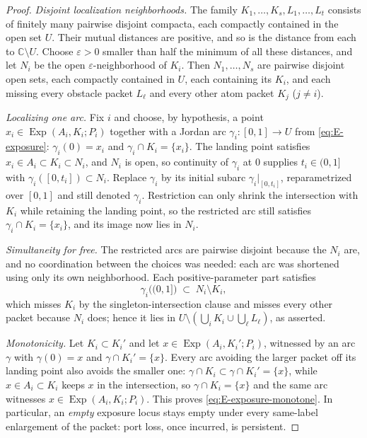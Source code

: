 \documentclass[11pt,reqno]{amsart}
\theoremstyle{definition}
\theoremstyle{remark}
\newcommand{\C}{\mathbb C}
\newcommand{\Exp}{\operatorname{Exp}}
\begin{document}
\begin{proof}
\emph{Disjoint localization neighborhoods.}
The family $K_1,\dots,K_s,L_1,\dots,L_t$ consists of finitely many pairwise disjoint
compacta, each compactly contained in the open set $U$. Their mutual distances are
positive, and so is the distance from each to $\C\setminus U$. Choose
$\varepsilon>0$ smaller than half the minimum of all these distances, and let $N_i$
be the open $\varepsilon$-neighborhood of $K_i$. Then $N_1,\dots,N_s$ are pairwise
disjoint open sets, each compactly contained in $U$, each containing its $K_i$, and
each missing every obstacle packet $L_\ell$ and every other atom packet $K_j$
($j\neq i$).

\emph{Localizing one arc.}
Fix $i$ and choose, by hypothesis, a point $x_i\in\Exp(A_i,K_i;P_i)$ together with a
Jordan arc $\gamma_i\colon[0,1]\to U$ from \eqref{eq:E-exposure}:
$\gamma_i(0)=x_i$ and $\gamma_i\cap K_i=\{x_i\}$. The landing point satisfies
$x_i\in A_i\subset K_i\subset N_i$, and $N_i$ is open, so continuity of $\gamma_i$ at
$0$ supplies $t_i\in(0,1]$ with $\gamma_i([0,t_i])\subset N_i$. Replace $\gamma_i$ by
its initial subarc $\gamma_i|_{[0,t_i]}$, reparametrized over $[0,1]$ and still
denoted $\gamma_i$. Restriction can only shrink the intersection with $K_i$ while
retaining the landing point, so the restricted arc still satisfies
$\gamma_i\cap K_i=\{x_i\}$, and its image now lies in $N_i$.

\emph{Simultaneity for free.}
The restricted arcs are pairwise disjoint because the $N_i$ are, and no coordination
between the choices was needed: each arc was shortened using only its own
neighborhood. Each positive-parameter part satisfies
\[
\gamma_i\bigl((0,1]\bigr)\;\subset\;N_i\setminus K_i,
\]
which misses $K_i$ by the singleton-intersection clause and misses every other packet
because $N_i$ does; hence it lies in
$U\setminus(\bigcup_iK_i\cup\bigcup_\ell L_\ell)$, as asserted.

\emph{Monotonicity.}
Let $K_i\subset K_i'$ and let $x\in\Exp(A_i,K_i';P_i)$, witnessed by an arc $\gamma$
with $\gamma(0)=x$ and $\gamma\cap K_i'=\{x\}$. Every arc avoiding the larger packet
off its landing point also avoids the smaller one: $\gamma\cap K_i\subset
\gamma\cap K_i'=\{x\}$, while $x\in A_i\subset K_i$ keeps $x$ in the intersection, so
$\gamma\cap K_i=\{x\}$ and the same arc witnesses $x\in\Exp(A_i,K_i;P_i)$. This
proves \eqref{eq:E-exposure-monotone}. In particular, an \emph{empty} exposure locus
stays empty under every same-label enlargement of the packet: port loss, once
incurred, is persistent.
\end{proof}
\end{document}

